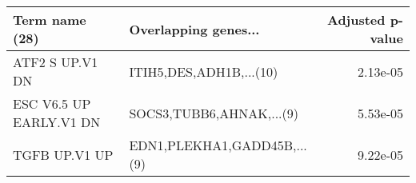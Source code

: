 \begin{tabular}{llr}
\toprule
         Term name (28) &        Overlapping genes... &  Adjusted p-value \\
\midrule
        ATF2 S UP.V1 DN &     ITIH5,DES,ADH1B,...(10) &          2.13e-05 \\
ESC V6.5 UP EARLY.V1 DN &    SOCS3,TUBB6,AHNAK,...(9) &          5.53e-05 \\
          TGFB UP.V1 UP & EDN1,PLEKHA1,GADD45B,...(9) &          9.22e-05 \\
\bottomrule
\end{tabular}
